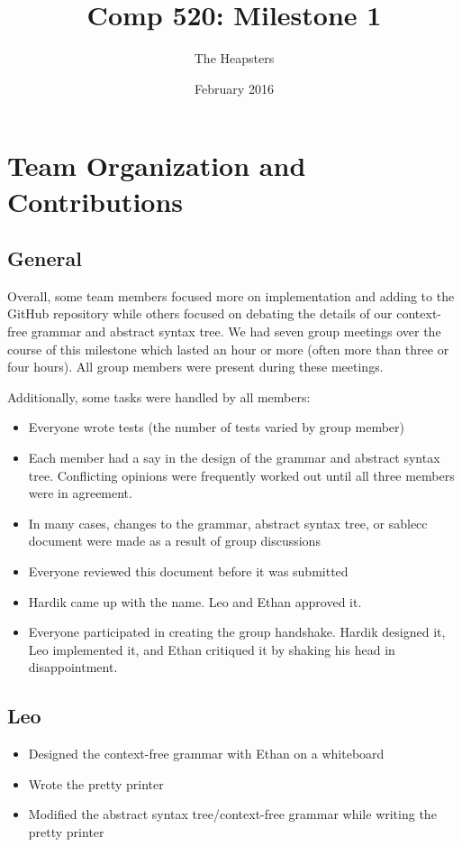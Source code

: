 \documentclass{article}
\title{Comp 520: Milestone 1}
\author{The Heapsters}
\date{February 2016}
\begin{document}
\maketitle

\section*{Team Organization and Contributions}

\subsection*{General}
Overall, some team members focused more on implementation and adding to the GitHub repository while others focused on debating the details of our context-free grammar and abstract syntax tree. We had seven group meetings over the course of this milestone which lasted an hour or more (often more than three or four hours). All group members were present during these meetings.

Additionally, some tasks were handled by all members:

\begin{itemize}
    \item Everyone wrote tests (the number of tests varied by group member)
    \item Each member had a say in the design of the grammar and abstract syntax tree. Conflicting opinions were frequently worked out until all three members were in agreement.
    \item In many cases, changes to the grammar, abstract syntax tree, or sablecc document were made as a result of group discussions
    \item Everyone reviewed this document before it was submitted
    \item Hardik came up with the name. Leo and Ethan approved it.
    \item Everyone participated in creating the group handshake. Hardik designed it, Leo implemented it, and Ethan critiqued it by shaking his head in disappointment.
\end{itemize}


\subsection*{Leo}

\begin{itemize}
    \item Designed the context-free grammar with Ethan on a whiteboard
    \item Wrote the pretty printer
    \item Modified the abstract syntax tree/context-free grammar while writing the pretty printer
\end{itemize}
\end{document}
